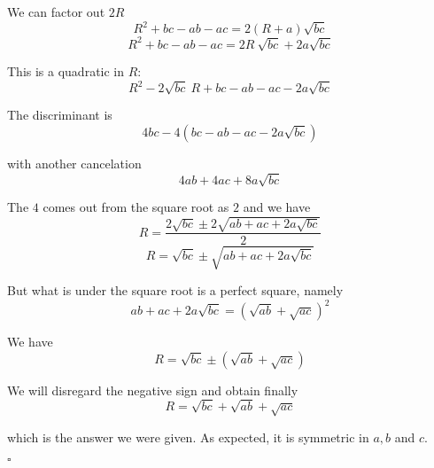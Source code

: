 \documentclass[11pt, oneside]{article}
\begin{document}
We can factor out $2R$
\[ R^2 + bc - ab - ac =  2 (R + a) \sqrt{bc} \]
\[ R^2 + bc - ab - ac =  2R \ \sqrt{bc} + 2a \sqrt{bc} \]

This is a quadratic in $R$:
\[ R^2 - 2 \sqrt{bc} \ R + bc - ab - ac - 2a \sqrt{bc} \]

The discriminant is
\[ 4bc - 4(bc - ab - ac - 2a \sqrt{bc}) \]

with another cancelation
\[ 4ab + 4ac + 8a \sqrt{bc} \]

The $4$ comes out from the square root as $2$ and we have
\[ R = \frac{2 \sqrt{bc} \pm 2 \sqrt{ab + ac + 2a \sqrt{bc}}}{2} \]
\[ R = \sqrt{bc} \pm \sqrt{ab + ac + 2a \sqrt{bc}} \]

But what is under the square root is a perfect square, namely
\[ ab + ac + 2a \sqrt{bc} = (\sqrt{ab} + \sqrt{ac})^2 \]

We have
\[ R = \sqrt{bc} \pm (\sqrt{ab} + \sqrt{ac}) \]

We will disregard the negative sign and obtain finally
\[ R = \sqrt{bc} + \sqrt{ab} + \sqrt{ac} \]

which is the answer we were given.  As expected, it is symmetric in $a,b$ and $c$.

$\square$
\end{document}
